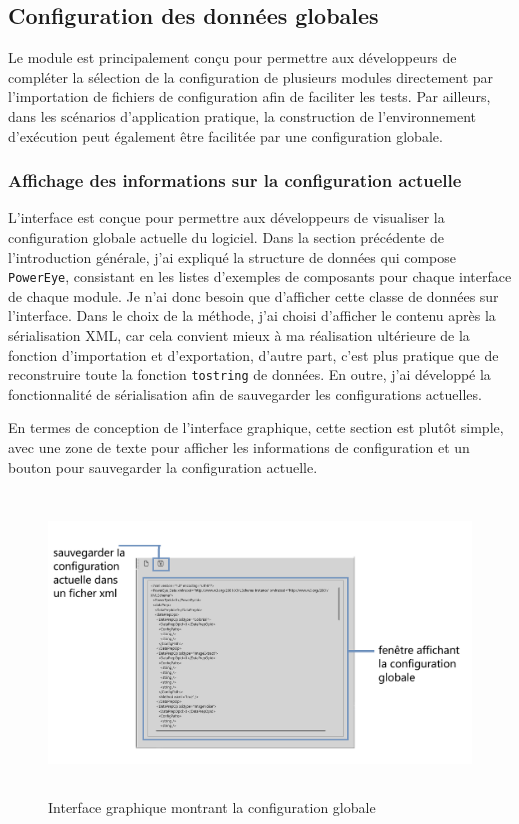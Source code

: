 \newpage
\subsection{Configuration des données globales}
Le module est principalement conçu pour permettre aux développeurs de compléter la sélection de la configuration de plusieurs modules directement par l'importation de fichiers de configuration afin de faciliter les tests. Par ailleurs, dans les scénarios d'application pratique, la construction de l'environnement d'exécution peut également être facilitée par une configuration globale.

\subsubsection{Affichage des informations sur la configuration actuelle}
L'interface est conçue pour permettre aux développeurs de visualiser la configuration globale actuelle du logiciel. Dans la section précédente de l'introduction générale, j'ai expliqué la structure de données qui compose \texttt{PowerEye}, consistant en les listes d'exemples de composants pour chaque interface de chaque module. Je n'ai donc besoin que d'afficher cette classe de données sur l'interface. Dans le choix de la méthode, j'ai choisi d'afficher le contenu après la sérialisation \gls{XML}, car cela convient mieux à ma réalisation ultérieure de la fonction d'importation et d'exportation, d'autre part, c'est plus pratique que de reconstruire toute la fonction \texttt{tostring} de données. En outre, j'ai développé la fonctionnalité de sérialisation afin de sauvegarder les configurations actuelles. 

En termes de conception de l'interface graphique, cette section est plutôt simple, avec une zone de texte pour afficher les informations de configuration et un bouton pour sauvegarder la configuration actuelle.
\begin{figure}[H]
    \centering
    \includegraphics[height=8cm]{ressources/images/global_configuration.png}
    \caption{Interface graphique montrant la configuration globale}
\end{figure}

